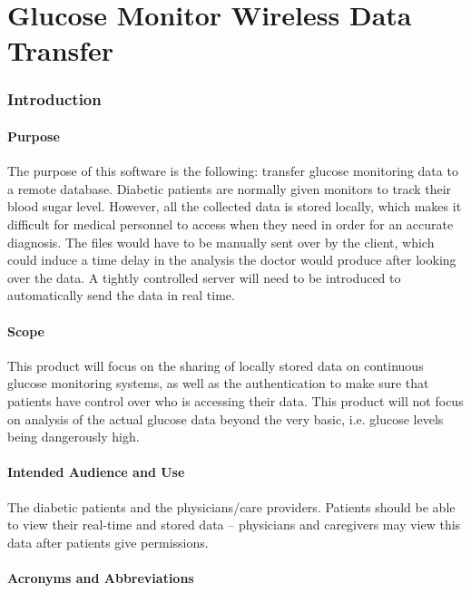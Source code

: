 \documentclass[12pt]{article}
\begin{document}
\pagebreak
\part{Glucose Monitor Wireless Data Transfer}

\section{Introduction}

\subsection{Purpose}

The purpose of this software is the following: transfer glucose monitoring data to a remote database. Diabetic
patients are normally given monitors to track their blood sugar level. However, all the collected data is stored
locally, which makes it difficult for medical personnel to access when they need in order for an accurate diagnosis.
The files would have to be manually sent over by the client, which could induce a time delay in the analysis the
doctor would produce after looking over the data. A tightly controlled server will need to be introduced to
automatically send the data in real time.

\subsection{Scope}

This product will focus on the sharing of locally stored data on continuous glucose monitoring systems, as well
as the authentication to make sure that patients have control over who is accessing their data. This product will not
focus on analysis of the actual glucose data beyond the very basic, i.e. glucose levels being dangerously high.

\subsection{Intended Audience and Use}

The diabetic patients and the physicians/care providers. Patients should be able to view their real-time and stored data
-- physicians and caregivers may view this data after patients give permissions.

\subsection{Acronyms and Abbreviations}
\end{document}
